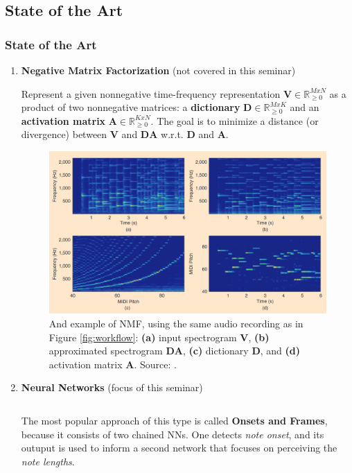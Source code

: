 \documentclass{beamer}
\newcommand{\emp}[1]{\textcolor{tum}{\textbf{#1}}}
\begin{document}
\subsection{State of the Art}
\begin{frame}[allowframebreaks]
	\frametitle{State of the Art}
	\begin{enumerate}
		\item \emp{Negative Matrix Factorization} (not covered in this seminar)

		      Represent a given nonnegative time-frequency representation $\boldsymbol{V}\in\mathbb{R}_{\geq0}^{MxN}$ as a product of two nonnegative matrices: a \textbf{dictionary} $\boldsymbol{D}\in\mathbb{R}_{\geq0}^{MxK}$ and an \textbf{activation matrix} $\boldsymbol{A}\in\mathbb{R}_{\geq0}^{KxN}$. The goal is to minimize a distance (or divergence) between $\boldsymbol{V}$ and $\boldsymbol{DA}$ w.r.t. $\boldsymbol{D}$ and $\boldsymbol{A}$.
		      \framebreak
		      \begin{figure}[!ht]
			      \centering
			      \includegraphics[width=.8\textwidth]{NMF.png}
			      \caption{And example of NMF, using the same audio recording as in Figure \ref{fig:workflow}: \textbf{(a)} input spectrogram $\boldsymbol{V}$, \textbf{(b)} approximated spectrogram $\boldsymbol{DA}$, \textbf{(c)} dictionary $\boldsymbol{D}$, and \textbf{(d)} activation matrix $\boldsymbol{A}$. Source: \cite{Overview}.}
			      \label{fig:NMF}
		      \end{figure}
		      \framebreak
		\item \emp{Neural Networks} (focus of this seminar)



		      \begin{columns}
			      \begin{column}{0.4\textwidth}
				      The most popular approach of this type is called \textbf{Onsets and Frames}, because it consists of two chained NNs. One detects \textit{note onset}, and its outuput is used to inform a second network that focuses on perceiving the \textit{note lengths}.
			      \end{column}


\end{columns}
\end{enumerate}
\end{frame}
\end{document}
